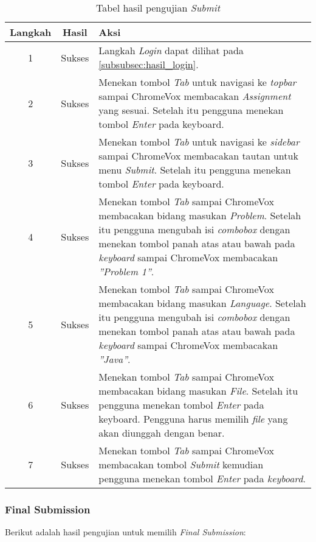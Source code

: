 \begin{table}[H]
	\centering
	\caption{Tabel hasil pengujian \textit{Submit}}
	\label{tab:hasil_submit}
	\begin{tabular}{|c|c|p{12cm}|}
		\toprule
		Langkah & Hasil & Aksi\\
		\midrule
		1 & Sukses & Langkah \textit{Login} dapat dilihat pada \ref{subsubsec:hasil_login}.\\
		2 & Sukses & Menekan tombol \textit{Tab} untuk navigasi ke \textit{topbar} sampai ChromeVox membacakan \textit{Assignment} yang sesuai. Setelah itu pengguna menekan tombol \textit{Enter} pada keyboard.\\
		3 & Sukses & Menekan tombol \textit{Tab} untuk navigasi ke \textit{sidebar} sampai ChromeVox membacakan tautan untuk menu \textit{Submit}. Setelah itu pengguna menekan tombol \textit{Enter} pada keyboard.\\
		4 & Sukses & Menekan tombol \textit{Tab} sampai ChromeVox membacakan bidang masukan \textit{Problem}. Setelah itu pengguna mengubah isi \textit{combobox} dengan menekan tombol panah atas atau bawah pada \textit{keyboard} sampai ChromeVox membacakan \textit{''Problem 1''}.\\
		5 & Sukses & Menekan tombol \textit{Tab} sampai ChromeVox membacakan bidang masukan \textit{Language}. Setelah itu pengguna mengubah isi \textit{combobox} dengan menekan tombol panah atas atau bawah pada \textit{keyboard} sampai ChromeVox membacakan \textit{''Java''}.\\
		6 & Sukses & Menekan tombol \textit{Tab} sampai ChromeVox membacakan bidang masukan \textit{File}. Setelah itu pengguna menekan tombol \textit{Enter} pada keyboard. Pengguna harus memilih \textit{file} yang akan diunggah dengan benar.\\
		7 & Sukses & Menekan tombol \textit{Tab} sampai ChromeVox membacakan tombol \textit{Submit} kemudian pengguna menekan tombol \textit{Enter} pada \textit{keyboard}.\\
		\bottomrule
	\end{tabular}
\end{table}

\subsubsection{Final Submission}
\label{subsubsec:hasil_final_submission}
Berikut adalah hasil pengujian untuk memilih \textit{Final Submission}:

